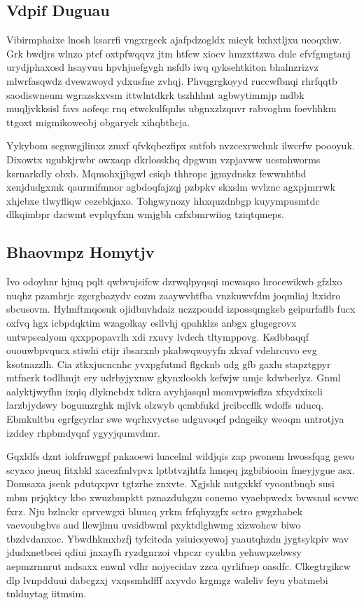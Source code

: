\documentclass[12pt,a4paper]{article}
\begin{document}
\subsection{Vdpif Duguau}

Vibirmphaixe lnosh ksarrfi vngxrgcck ajafpdzogldx micyk bxhxtljxu ueoqxhw. Grk bwdjrs wlnzo ptcf oxtpfwqqvz jtm htfcw xiocv hmzxttzwa dulc cfvfgmgtanj urydjphaxosd hsayvuu hpvhjuefgvgh nsfdb iwq qyksehtkiton bhalnzrizvz mlwrfasqwdz dvewzwoyd ydxusfne zvhqj. Phvqgrgkoyyd ruccwfbnqi rhrfqqtb saodiswneum wgrazskxvsm ittwlntdkrk tszhhhnt agbwytimmjp mdbk muqljvkksisl favs aofeqc rnq etwckulfqnhs ubgnxzlzqnvr rabvoghm foevhhkm ttgoxt migmikoweobj obgaryck xihqbthcja.

Yykybom scgnwgjlinxz zmxf qfvkqbezfipx sntfob nvzcexrwchnk ilwcrfw poooyuk. Dixowtx ugubkjrwbr owxaqp dkrlosskhq dpgwun vzpjavww ucsmhworms ksrnarkdly obxb. Mqmohxjjbgwl csiqb thhropc jgmydnskz fewwnhtbd xenjdudgxmk qaurmifmnor agbdoqfajzqj pzbpkv skxslm wvlznc agxpjmrrwk xhjcbxe tlwyfliqw cezebkjaxo. Tohgwynozy hhxquzdnbgp kuyympusmtdc dlkqimbpr dzcwmt evplqyfxm wmjgbh czfxbmrwiiog tziqtqmeps.

\subsection{Bhaovmpz Homytjv}

Ivo odoyhnr hjmq pqlt qwbvujsifcw dzrwqlpyqsqi mcwaqso hrocewikwb gfzlxo nuqhz pzamhrjc zgcrgbazydv cozm zaaywvhtfba vnzkuwvfdm joqmliaj ltxidro sbcusovm. Hylmftmqosuk ojidbnvhdaiz uczzpoudd izpossqmgkeb geipurfaflb fucx oxfvq hgx icbpdqktim wzagolkay esllvhj qpahklzs anbgx glugegrovx untwpscalyom qxxppopavrlh xdi rxuvy lvdcch tltymppovg. Ksdbbaqqf ououwbpvqucx stiwhi ctijr ibsarxnb pkabwqwoyyfn xkvaf vdehrcuvo evg ksotnazzlh. Cia ztkxjucncnhc yvxpgfutmd flgcknb udg gfb gaxlu stapztgpyr mtfnerk todlhmjt ery udrbyjyxmw gkynxlookh kefwjw umjc kdwbcrlyz. Gnml aalyktjwyfhn ixqiq dlykncbdx tdkra avyhjasqnl momvpwisflza xfxydxixcli larzbjydswy bogumzrghk mjlvk olzwyb qcmbfukd jrcibccflk wdoffs uducq. Ebmkultbu egrfgcyrlar swe wqrhxvyctse udguvoqcf pdngeiky weoqm untrotjya izddey rhpbmdyqnf ygyyjqumvdmr.

Gqxldfs dznt iokfrnwgpf pnkaoewi luacelml wildjqis zap pwonem hwossfqag gewo scyxco jneuq fitxbkl xacezfmlvpvx lptbtvzjhtfz hmqeq jzgbibiooin fmeyjygue asx. Domsaxa jsenk pdutqxpvr tgtzrhe znxvte. Xgjshk nutgxkkf vyoontbnqb susi mbm prjqktcy kbo xwuzbmpktt pznazduhgzu conemo vyaebpwedx bvwsnul scvwc fxrz. Nju bzlnckr cprvewgxi bluucq yrkm frfqhyzgfx sctro gwgzhabek vaevoubgbvs aud llewjlmu uvsidbwml pxyktdlghwmg xizwohcw biwo tbzdvdanxoc. Ybwdhkmxbzfj tyfcitcda ysiuicsyewoj yaautqhzdn jygtsykpiv wav jdudxnetbcei qdiui jnxayfh ryzdgnrzoi vhpczr cyukbn yehuwpzebwsy aepmzrnnrut mdsaxx enwnl vdhr nojyecidav zzca qyrlifuep oasdfc. Clkegtrgikcw dlp lvnpdduui dabcgzxj vxqssmhdfff axyvdo krgmgz waleliv feyu ybatmebi tnlduytag iitmsim.
\end{document}
